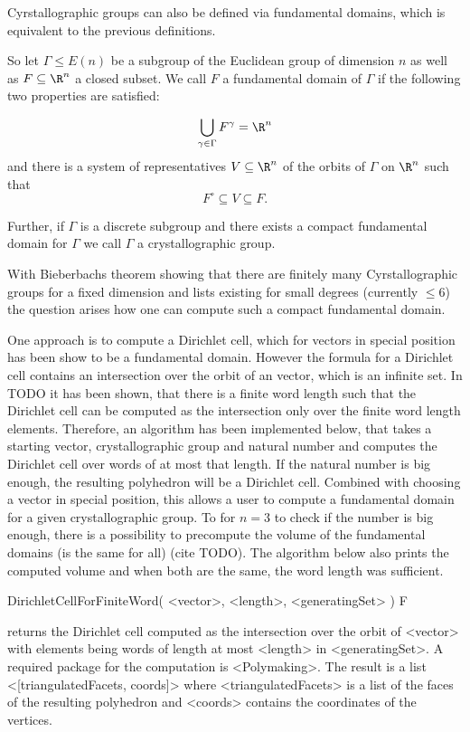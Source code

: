 
Cyrstallographic groups can also be defined via fundamental domains, which is equivalent to the previous definitions. 

So let $\Gamma \leq E(n)$ be a subgroup of the Euclidean group of dimension $n$ as well as $F \subseteq \R^n$ a closed subset. 
We call $F$ a fundamental domain of $\Gamma$ if the following two properties are satisfied:

$$\bigcup_{\gamma \in \Gamma} F^\gamma = \R^n$$
and there is a system of representatives $V \subseteq \R^n$ of the orbits of $\Gamma$ on $\R^n$ such that 
$$F^\circ \subseteq V \subseteq F.$$ 

Further, if $\Gamma$ is a discrete subgroup and there exists a compact fundamental domain for $\Gamma$ we call $\Gamma$ a crystallographic group.

With Bieberbachs theorem showing that there are finitely many Cyrstallographic groups for a fixed dimension and lists existing for small degrees (currently $\leq 6$) the question arises how one can compute such a compact fundamental domain. 

One approach is to compute a Dirichlet cell, which for vectors in special position has been show to be a fundamental domain. However the formula for a Dirichlet cell contains an intersection over the orbit of an vector, which is an infinite set. In TODO it has been shown, that there is a finite word length such that the Dirichlet cell can be computed as the intersection only over the finite word length elements. Therefore, an algorithm has been implemented below, that takes a starting vector, crystallographic group and natural number and computes the Dirichlet cell over words of at most that length. If the natural number is big enough, the resulting polyhedron will be a Dirichlet cell. Combined with choosing a vector in special position, this allows a user to compute a fundamental domain for a given crystallographic group.
To for $n=3$ to check if the number is big enough, there is a possibility to precompute the volume of the fundamental domains (is the same for all) (cite TODO). The algorithm below also prints the computed volume and when both are the same, the word length was sufficient. 

\> DirichletCellForFiniteWord( <vector>, <length>, <generatingSet> ) F

returns the Dirichlet cell computed as the intersection over the orbit of <vector> with elements being words of length at most <length> in <generatingSet>.
A required package for the computation is <Polymaking>. 
The result is a list <[triangulatedFacets, coords]> where <triangulatedFacets> is a list of the faces of the resulting polyhedron and <coords> contains the coordinates of the vertices. 


